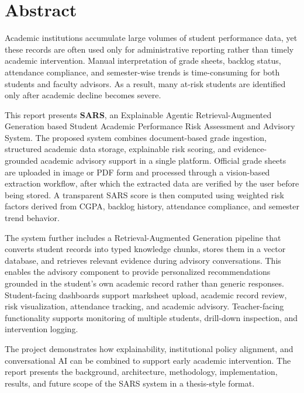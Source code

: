 \chapter*{Abstract}

Academic institutions accumulate large volumes of student performance data, yet these records are often used only for administrative reporting rather than timely academic intervention. Manual interpretation of grade sheets, backlog status, attendance compliance, and semester-wise trends is time-consuming for both students and faculty advisors. As a result, many at-risk students are identified only after academic decline becomes severe.

This report presents \textbf{SARS}, an Explainable Agentic Retrieval-Augmented Generation based Student Academic Performance Risk Assessment and Advisory System. The proposed system combines document-based grade ingestion, structured academic data storage, explainable risk scoring, and evidence-grounded academic advisory support in a single platform. Official grade sheets are uploaded in image or PDF form and processed through a vision-based extraction workflow, after which the extracted data are verified by the user before being stored. A transparent SARS score is then computed using weighted risk factors derived from CGPA, backlog history, attendance compliance, and semester trend behavior.

The system further includes a Retrieval-Augmented Generation pipeline that converts student records into typed knowledge chunks, stores them in a vector database, and retrieves relevant evidence during advisory conversations. This enables the advisory component to provide personalized recommendations grounded in the student's own academic record rather than generic responses. Student-facing dashboards support marksheet upload, academic record review, risk visualization, attendance tracking, and academic advisory. Teacher-facing functionality supports monitoring of multiple students, drill-down inspection, and intervention logging.

The project demonstrates how explainability, institutional policy alignment, and conversational AI can be combined to support early academic intervention. The report presents the background, architecture, methodology, implementation, results, and future scope of the SARS system in a thesis-style format.

\clearpage
